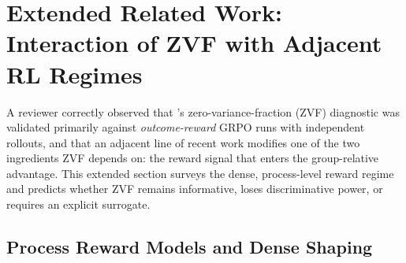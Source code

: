 
\section{Extended Related Work: Interaction of ZVF with Adjacent RL Regimes}
\label{sec:extended-related-work}

A reviewer correctly observed that \ours{}'s zero-variance-fraction (ZVF)
diagnostic was validated primarily against \emph{outcome-reward} GRPO runs with
independent rollouts, and that an adjacent line of recent work modifies one of
the two ingredients ZVF depends on: the reward signal that enters the
group-relative advantage. This extended section surveys the dense,
process-level reward regime and predicts whether ZVF remains informative,
loses discriminative power, or requires an explicit surrogate.

\subsection{Process Reward Models and Dense Shaping}
\label{sec:ext:tree-prm}

